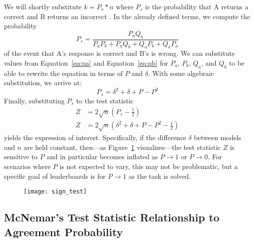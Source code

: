 We will shortly substitute $k=P_s*n$ where $P_s$ is the probability that \subj{} A returns a correct \resp{} and \subj{} B returns an incorrect \resp{}.
In the already defined terms, we compute the probability
\begin{equation}
    P_s=\frac{P_aQ_b}{P_aP_b+P_aQ_b+Q_aP_b+Q_aP_a}
\end{equation}
of the event that \subj{} A's response is correct and B's is wrong.
We can substitute values from Equation~\ref{eq:pa} and Equation~\ref{eq:pb} for $P_a$, $P_b$, $Q_a$, and $Q_b$ to be able to rewrite the equation in terms of $P$ and $\delta$.
With some algebraic substitution, we arrive at:
%
\begin{equation}
    P_s = \delta^2+\delta + P - P^2
\end{equation}
\noindent
Finally, substituting $P_s$ to the test statistic
\begin{align}
    Z & =2\sqrt{n}(P_s - \frac{1}{2})                       \\
    Z & =2\sqrt{n}(\delta^2+\delta + P - P^2 - \frac{1}{2})
\end{align}
yields the expression of interest.
Specifically, if the difference $\delta$ between models and $n$ are held constant, then---as Figure~\ref{fig:sign-test} visualizes---the test statistic $Z$ is sensitive to $P$ and in particular becomes inflated as $P\rightarrow 1$ or $P\rightarrow 0$.
For scenarios where $P$ is not expected to vary, this may not be problematic, but a specific goal of leaderboards is for $P\rightarrow 1$ as the task is solved.

\begin{figure}[t]
    \centering
    \texttt{[image: sign\_test]}
    \caption{
    }
    \label{fig:sign-test}
\end{figure}

\subsection{McNemar's Test Statistic Relationship to Agreement Probability}
\label{ch:isicle:apx:mcnemar}

